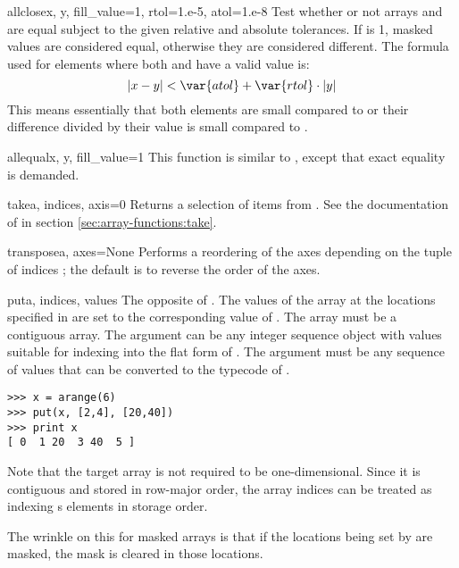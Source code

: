 \begin{funcdesc}{allclose}{x, y, fill_value=1, rtol=1.e-5, atol=1.e-8}
   Test whether or not arrays  and  are equal subject to the
   given relative and absolute tolerances. If  is 1, masked
   values are considered equal, otherwise they are considered different. The
   formula used for elements where both  and  have a valid value
   is:
   \begin{equation}
      |x-y| < \var{atol} + \var{rtol} \cdot{} |y|
   \end{equation}
   This means essentially that both elements are small compared to 
   or their difference divided by their value is small compared to .
\end{funcdesc}

\begin{funcdesc}{allequal}{x, y, fill_value=1}
   This function is similar to , except that exact equality
   is demanded. 
\end{funcdesc}

\begin{funcdesc}{take}{a, indices, axis=0}
   Returns a selection of items from . See the documentation of
    in section \ref{sec:array-functions:take}.
\end{funcdesc}

\begin{funcdesc}{transpose}{a, axes=None}
   Performs a reordering of the axes depending on the tuple of indices
   ; the default is to reverse the order of the axes.
\end{funcdesc}

\begin{funcdesc}{put}{a, indices, values}
   The opposite of . The values of the array  at the
   locations specified in  are set to the corresponding value of
   .  The array  must be a contiguous array. The argument
    can be any integer sequence object with values suitable for
   indexing into the flat form of .  The argument  must be
   any sequence of values that can be converted to the typecode of .
\begin{verbatim}
>>> x = arange(6)
>>> put(x, [2,4], [20,40])
>>> print x
[ 0  1 20  3 40  5 ]
\end{verbatim}
   Note that the target array  is not required to be one-dimensional.
   Since it is contiguous and stored in row-major order, the array indices can
   be treated as indexing s elements in storage order.
   
   The wrinkle on this for masked arrays is that if the locations being set by
    are masked, the mask is cleared in those locations.
\end{funcdesc}

